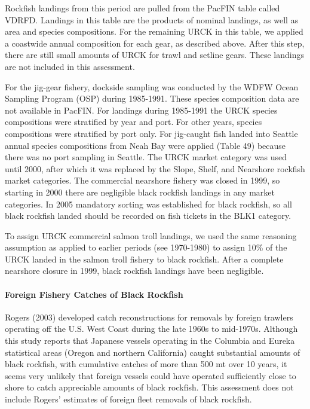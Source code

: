 \documentclass[11pt,
  english,
  letterpaper,
]{article}
\begin{document}
Rockfish landings from this period are pulled from the PacFIN table called VDRFD. Landings in this table are the products of nominal landings, as well as area and species compositions. For the remaining URCK in this table, we applied a coastwide annual composition for each gear, as described above. After this step, there are still small amounts of URCK for trawl and setline gears. These landings are not included in this assessment.

For the jig-gear fishery, dockside sampling was conducted by the WDFW Ocean Sampling Program (OSP) during 1985-1991. These species composition data are not available in PacFIN. For landings during 1985-1991 the URCK species compositions were stratified by year and port. For other years, species compositions were stratified by port only. For jig-caught fish landed into Seattle annual species compositions from Neah Bay were applied (Table 49) because there was no port sampling in Seattle. The URCK market category was used until 2000, after which it was replaced by the Slope, Shelf, and Nearshore rockfish market categories. The commercial nearshore fishery was closed in 1999, so starting in 2000 there are negligible black rockfish landings in any market categories. In 2005 mandatory sorting was established for black rockfish, so all black rockfish landed should be recorded on fish tickets in the BLK1 category.

To assign URCK commercial salmon troll landings, we used the same reasoning assumption as applied to earlier periods (see 1970-1980) to assign 10\% of the URCK landed in the salmon troll fishery to black rockfish. After a complete nearshore closure in 1999, black rockfish landings have been negligible.

\hypertarget{foreign-fishery-catches-of-black-rockfish}{%
\paragraph{Foreign Fishery Catches of Black Rockfish}\label{foreign-fishery-catches-of-black-rockfish}}

Rogers (2003) developed catch reconstructions for removals by foreign trawlers operating off the U.S. West Coast during the late 1960s to mid-1970s. Although this study reports that Japanese vessels operating in the Columbia and Eureka statistical areas (Oregon and northern California) caught substantial amounts of black rockfish, with cumulative catches of more than 500 mt over 10 years, it seems very unlikely that foreign vessels could have operated sufficiently close to shore to catch appreciable amounts of black rockfish. This assessment does not include Rogers' estimates of foreign fleet removals of black rockfish.
\end{document}
